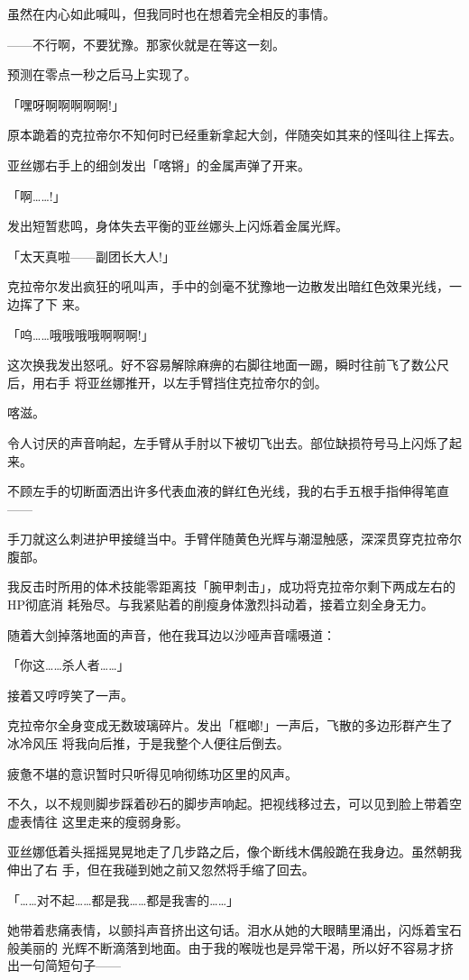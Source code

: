 \documentclass[11pt]{book}
\begin{document}
虽然在内心如此喊叫，但我同时也在想着完全相反的事情。

——不行啊，不要犹豫。那家伙就是在等这一刻。

预测在零点一秒之后马上实现了。

「嘿呀啊啊啊啊啊!」

原本跪着的克拉帝尔不知何时已经重新拿起大剑，伴随突如其来的怪叫往上挥去。

亚丝娜右手上的细剑发出「喀锵」的金属声弹了开来。

「啊……!」

发出短暂悲鸣，身体失去平衡的亚丝娜头上闪烁着金属光辉。

「太天真啦——副团长大人!」

克拉帝尔发出疯狂的吼叫声，手中的剑毫不犹豫地一边散发出暗红色效果光线，一边挥了下
来。

「呜……哦哦哦哦啊啊啊!」

这次换我发出怒吼。好不容易解除麻痹的右脚往地面一踢，瞬时往前飞了数公尺后，用右手
将亚丝娜推开，以左手臂挡住克拉帝尔的剑。

喀滋。

令人讨厌的声音响起，左手臂从手肘以下被切飞出去。部位缺损符号马上闪烁了起来。

不顾左手的切断面洒出许多代表血液的鲜红色光线，我的右手五根手指伸得笔直——

手刀就这么刺进护甲接缝当中。手臂伴随黄色光辉与潮湿触感，深深贯穿克拉帝尔腹部。

我反击时所用的体术技能零距离技「腕甲刺击」，成功将克拉帝尔剩下两成左右的HP彻底消
耗殆尽。与我紧贴着的削瘦身体激烈抖动着，接着立刻全身无力。

随着大剑掉落地面的声音，他在我耳边以沙哑声音嚅嗫道：

「你这……杀人者……」

接着又哼哼笑了一声。

克拉帝尔全身变成无数玻璃碎片。发出「框啷!」一声后，飞散的多边形群产生了冰冷风压
将我向后推，于是我整个人便往后倒去。

疲惫不堪的意识暂时只听得见响彻练功区里的风声。

不久，以不规则脚步踩着砂石的脚步声响起。把视线移过去，可以见到脸上带着空虚表情往
这里走来的瘦弱身影。

亚丝娜低着头摇摇晃晃地走了几步路之后，像个断线木偶般跪在我身边。虽然朝我伸出了右
手，但在我碰到她之前又忽然将手缩了回去。

「……对不起……都是我……都是我害的……」

她带着悲痛表情，以颤抖声音挤出这句话。泪水从她的大眼睛里涌出，闪烁着宝石般美丽的
光辉不断滴落到地面。由于我的喉咙也是异常干渴，所以好不容易才挤出一句简短句子——
\end{document}
